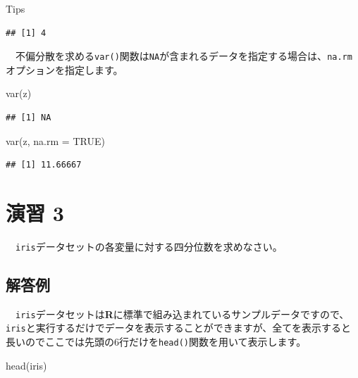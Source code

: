 \documentclass[
  12pt,
]{book}
\newenvironment{Shaded}{\begin{snugshade}}{\end{snugshade}}
\newcommand{\AttributeTok}[1]{\textcolor[rgb]{0.77,0.63,0.00}{#1}}
\newcommand{\ConstantTok}[1]{\textcolor[rgb]{0.00,0.00,0.00}{#1}}
\newcommand{\FunctionTok}[1]{\textcolor[rgb]{0.00,0.00,0.00}{#1}}
\newcommand{\NormalTok}[1]{#1}
\begin{document}
\begin{info-box}{Tips}
\begin{verbatim}
## [1] 4
\end{verbatim}

　不偏分散を求める\texttt{var()}関数は\texttt{NA}が含まれるデータを指定する場合は、\texttt{na.rm}オプションを指定します。

\begin{Shaded}
\begin{Highlighting}[numbers=left,,]
\FunctionTok{var}\NormalTok{(z)}
\end{Highlighting}
\end{Shaded}

\begin{verbatim}
## [1] NA
\end{verbatim}

\begin{Shaded}
\begin{Highlighting}[numbers=left,,]
\FunctionTok{var}\NormalTok{(z, }\AttributeTok{na.rm =} \ConstantTok{TRUE}\NormalTok{)}
\end{Highlighting}
\end{Shaded}

\begin{verbatim}
## [1] 11.66667
\end{verbatim}

\end{info-box}

\newpage

\hypertarget{ux6f14ux7fd2-3-1}{%
\section*{演習 3}\label{ux6f14ux7fd2-3-1}}

　\texttt{iris}データセットの各変量に対する四分位数を求めなさい。

\hypertarget{ux89e3ux7b54ux4f8b-2}{%
\subsection*{解答例}\label{ux89e3ux7b54ux4f8b-2}}

　\texttt{iris}データセットは\textbf{R}に標準で組み込まれているサンプルデータですので、\texttt{iris}と実行するだけでデータを表示することができますが、全てを表示すると長いのでここでは先頭の6行だけを\texttt{head()}関数を用いて表示します。

\begin{Shaded}
\begin{Highlighting}[numbers=left,,]
\FunctionTok{head}\NormalTok{(iris)}
\end{Highlighting}
\end{Shaded}
\end{document}
